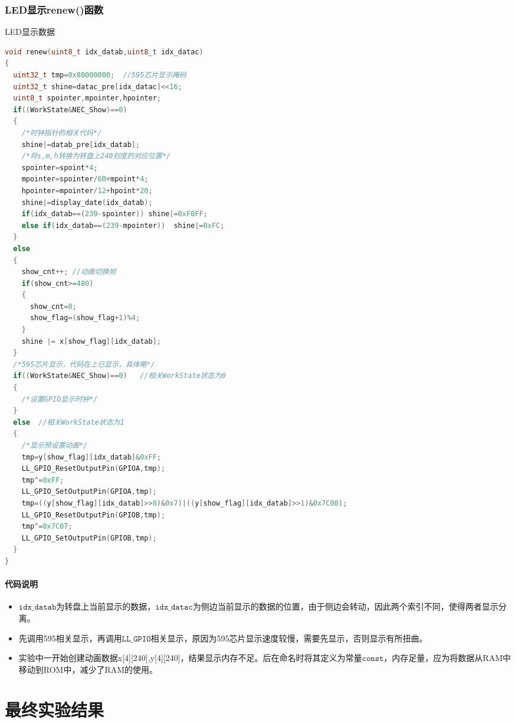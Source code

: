 \documentclass{article}
\begin{document}
\subsubsection{LED显示renew()函数}
LED显示数据
\begin{multicols}{2}
\begin{lstlisting}[language=c]
void renew(uint8_t idx_datab,uint8_t idx_datac)
{
  uint32_t tmp=0x80000000;  //595芯片显示掩码
  uint32_t shine=datac_pre[idx_datac]<<16;  
  uint8_t spointer,mpointer,hpointer;
  if((WorkState&NEC_Show)==0)
  {
    /*时钟指针的相关代码*/
    shine|=datab_pre[idx_datab];
    /*将s,m,h转换为转盘上240刻度的对应位置*/
    spointer=spoint*4;
    mpointer=spointer/60+mpoint*4;
    hpointer=mpointer/12+hpoint*20;
    shine|=display_date(idx_datab);
    if(idx_datab==(239-spointer)) shine|=0xF0FF;
    else if(idx_datab==(239-mpointer))  shine|=0xFC; 
  }
  else
  {
    show_cnt++; //动画切换帧
    if(show_cnt>=480)
    {
      show_cnt=0;
      show_flag=(show_flag+1)%4;
    }
    shine |= x[show_flag][idx_datab];
  }
  /*595芯片显示，代码在上已显示，具体略*/
  if((WorkState&NEC_Show)==0)   //相关WorkState状态为0
  {
    /*设置GPIO显示时钟*/
  }
  else  //相关WorkState状态为1
  {
    /*显示预设置动画*/
    tmp=y[show_flag][idx_datab]&0xFF;
    LL_GPIO_ResetOutputPin(GPIOA,tmp);
    tmp^=0xFF;
    LL_GPIO_SetOutputPin(GPIOA,tmp);
    tmp=((y[show_flag][idx_datab]>>8)&0x7)|((y[show_flag][idx_datab]>>1)&0x7C00);
    LL_GPIO_ResetOutputPin(GPIOB,tmp);
    tmp^=0x7C07;
    LL_GPIO_SetOutputPin(GPIOB,tmp);
  }
}
\end{lstlisting}
\end{multicols}
\paragraph{代码说明}
\begin{itemize}
    \item $\texttt{idx\_datab}$为转盘上当前显示的数据，$\texttt{idx\_datac}$为侧边当前显示的数据的位置，由于侧边会转动，因此两个索引不同，使得两者显示分离。
    \item 先调用595相关显示，再调用$\texttt{LL\_GPIO}$相关显示，原因为595芯片显示速度较慢，需要先显示，否则显示有所扭曲。
    \item 实验中一开始创建动画数据x[4][240],y[4][240]，结果显示内存不足。后在命名时将其定义为常量$\texttt{const}$，内存足量，应为将数据从RAM中移动到ROM中，减少了RAM的使用。
\end{itemize}
\section{最终实验结果}
\end{document}
